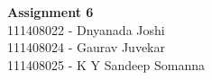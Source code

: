 \documentclass[main.tex]{subfiles}
\begin{document}
\begin{titlepage}

\begin{center}
  \LARGE{\bf{Assignment 6\\}}
  \horrule{0.4pt}
  111408022 - Dnyanada Joshi \\
  111408024 - Gaurav Juvekar \\
  111408025 - K Y Sandeep Somanna \\
\end{center}
\horrule{0.4pt}
\end{titlepage}
\end{document}
